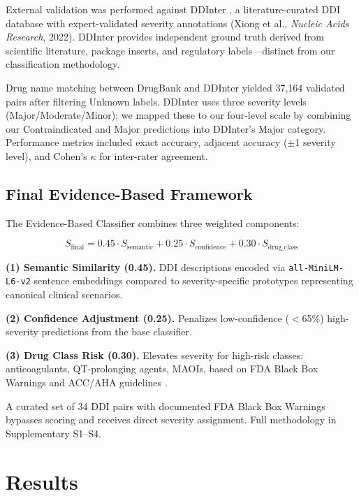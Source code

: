 \documentclass[11pt,a4paper]{article}
\begin{document}
External validation was performed against DDInter \cite{ddinter2022}, a literature-curated DDI database with expert-validated severity annotations (Xiong et al., \textit{Nucleic Acids Research}, 2022). DDInter provides independent ground truth derived from scientific literature, package inserts, and regulatory labels---distinct from our classification methodology.

Drug name matching between DrugBank and DDInter yielded 37,164 validated pairs after filtering Unknown labels. DDInter uses three severity levels (Major/Moderate/Minor); we mapped these to our four-level scale by combining our Contraindicated and Major predictions into DDInter's Major category. Performance metrics included exact accuracy, adjacent accuracy ($\pm$1 severity level), and Cohen's $\kappa$ for inter-rater agreement.

\subsection*{Final Evidence-Based Framework}

The Evidence-Based Classifier combines three weighted components:

\begin{equation}
S_{\text{final}} = 0.45 \cdot S_{\text{semantic}} + 0.25 \cdot S_{\text{confidence}} + 0.30 \cdot S_{\text{drug\_class}}
\end{equation}

\textbf{(1) Semantic Similarity (0.45).} DDI descriptions encoded via \texttt{all-MiniLM-L6-v2} sentence embeddings compared to severity-specific prototypes representing canonical clinical scenarios.

\textbf{(2) Confidence Adjustment (0.25).} Penalizes low-confidence ($<$65\%) high-severity predictions from the base classifier.

\textbf{(3) Drug Class Risk (0.30).} Elevates severity for high-risk classes: anticoagulants, QT-prolonging agents, MAOIs, based on FDA Black Box Warnings and ACC/AHA guidelines \cite{joglar2023,beavers2022}.

A curated set of 34 DDI pairs with documented FDA Black Box Warnings bypasses scoring and receives direct severity assignment. Full methodology in Supplementary S1--S4.

\section*{Results}
\end{document}
